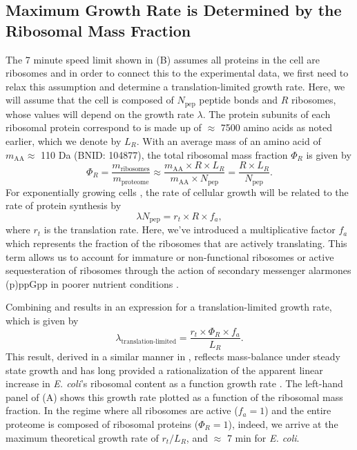 \subsection{Maximum Growth Rate is Determined by the Ribosomal Mass Fraction}
The 7 minute speed limit shown in (B) assumes all
proteins in the cell are ribosomes and in order to connect this to the
experimental data, we first need to relax this assumption and determine a
translation-limited growth rate. Here, we will assume that the cell is composed
of $N_\text{pep}$ peptide bonds and $R$ ribosomes, whose values will depend on the
growth rate $\lambda$. The protein subunits of each ribosomal protein correspond to
is made up of $\approx$ 7500
amino acids as noted earlier, which we denote by $L_R$.
With an average mass of an amino acid of $m_\text{AA} \approx$ 110
Da (BNID: 104877), the total ribosomal mass fraction  $\Phi_R$ is given by
\begin{equation}
  \Phi_R = \frac{m_\text{ribosomes} }{m_\text{proteome}} \approx \frac{m_\text{AA} \times R \times L_R}{m_\text{AA} \times N_\text{pep}} = \frac{R \times L_R}{N_\text{pep}}.
  \label{eq:phir}
\end{equation}
For exponentially growing cells \citep{godin2010}, the rate of cellular growth will
be related to the rate of protein synthesis by
\begin{equation}
  \lambda N_\text{pep} = r_t \times R \times f_a,
  \label{eq:lam_npep}
\end{equation}
where $r_t$ is the translation rate. Here, we've introduced a multiplicative
factor $f_a$ which represents the fraction of the ribosomes that are actively
translating. This term allows us to account for immature or
non-functional ribosomes or active sequesteration of ribosomes through the action of
secondary messenger alarmones (p)ppGpp in poorer nutrient conditions \cite{hauryliuk2015}.

Combining  and  results in an expression for a
translation-limited growth rate, which is given by
\begin{equation}
\lambda_\text{translation-limited} = \frac{r_t\times \Phi_R\times f_a}{L_R}.
\label{eq:lam_limited}
\end{equation}
This result, derived in a similar manner in \cite{klump2013}, reflects
mass-balance under steady state growth and has long provided a rationalization
of the apparent linear increase in \textit{E. coli}'s ribosomal content as a
function growth rate \citep{goldberger1979, dennis2004, scott2010}. The
left-hand panel of (A) shows this growth rate plotted as a
function of the ribosomal mass fraction.  In the regime where all ribosomes are
active ($f_a = 1$) and the entire proteome is composed of ribosomal proteins
($\Phi_R = 1$), indeed, we arrive at the maximum theoretical growth rate of $r_t
/ L_R$, and $\approx$ 7 min for \textit{E. coli}.

